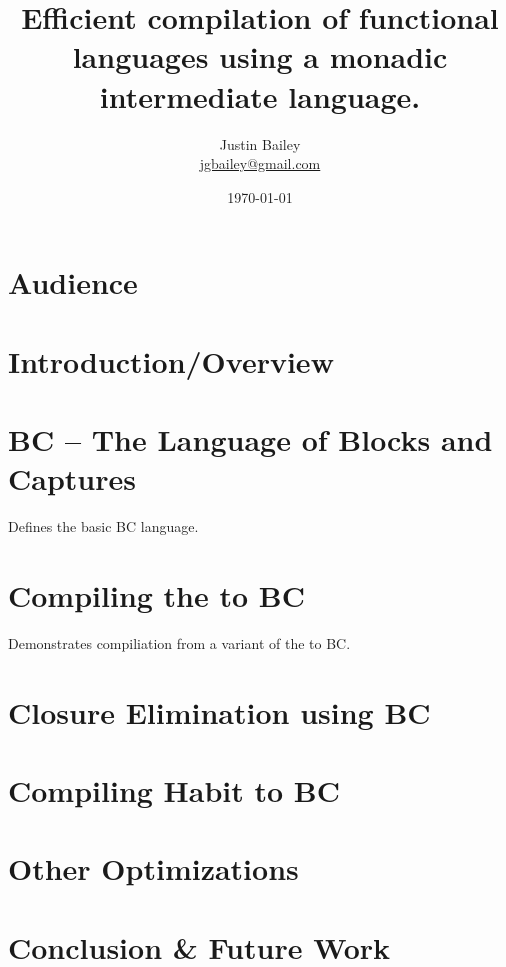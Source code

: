 \documentclass[11pt]{article}
\title{Efficient compilation of functional languages using a monadic
  intermediate language.}
\author{Justin Bailey \\ \url{jgbailey@gmail.com}}
\date{\today}
\begin{document}
\VerbatimFootnotes
\DefineShortVerb{\#}
\doublespacing

\maketitle

\section{Audience}

\section{Introduction/Overview}

\section{BC -- The Language of Blocks and Captures}

Defines the basic BC language.

\section{Compiling the \lamA to BC}

Demonstrates compiliation from a variant of the \lamA to BC. 

\section{Closure Elimination using BC}

\section{Compiling Habit to BC}

\section{Other Optimizations}

\section{Conclusion \& Future Work}
\end{document}
